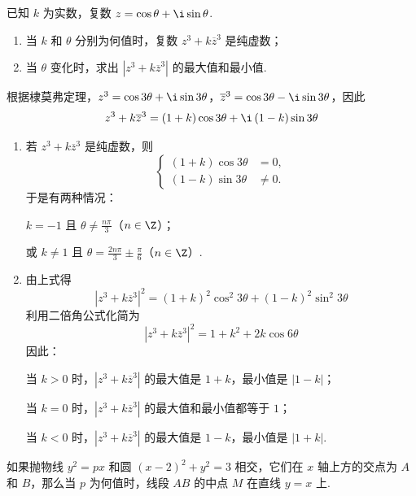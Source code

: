 \documentclass[UTF8,a4paper,oneside,11pt]{ctexbook}
\begin{document}
\begin{problem}

已知 \(k\) 为实数，复数 \(z=\cos\theta+\i\sin\theta\).

\begin{enumerate}
\item 当 \(k\) 和 \(\theta\) 分别为何值时，复数 \(z^3+k\overline{z}^3\) 是纯虚数；
\item 当 \(\theta\) 变化时，求出 \(\left| z^3+k\overline{z}^3 \right|\) 的最大值和最小值.
\end{enumerate}
\end{problem}

\begin{solution}
根据棣莫弗定理，\(z^3=\cos 3\theta+\i\sin 3\theta\)，\(\overline{z}^3=\cos 3\theta-\i\sin 3\theta\)，因此
\[
z^3+k\overline{z}^3=\left( 1+k \right)\cos 3\theta+\i\left( 1-k \right)\sin 3\theta
\]

\begin{enumerate}
\item 若 \(z^3+k\overline{z}^3\) 是纯虚数，则
\[
\begin{cases}
\left( 1+k \right)\cos 3\theta&=0,\\
\left( 1-k \right)\sin 3\theta&\ne 0.
\end{cases}
\]
于是有两种情况：

\(k=-1\) 且 \(\theta\ne \frac{n\pi}{3}\)（\(n\in\Z\)）；

或 \(k\ne 1\) 且 \(\theta=\frac{2n\pi}{3}\pm \frac{\pi}{6}\)（\(n\in\Z\)）.

\item 由上式得
\[
\left| z^3+k\overline{z}^3 \right|^2=\left( 1+k \right)^2\cos^2 3\theta+\left( 1-k \right)^2\sin^2 3\theta
\]
利用二倍角公式化简为
\[
\left| z^3+k\overline{z}^3 \right|^2=1+k^2+2k\cos 6\theta
\]
因此：

当 \(k>0\) 时，\(\left| z^3+k\overline{z}^3 \right|\) 的最大值是 \(1+k\)，最小值是 \(|1-k|\)；

当 \(k=0\) 时，\(\left| z^3+k\overline{z}^3 \right|\) 的最大值和最小值都等于 \(1\)；

当 \(k<0\) 时，\(\left| z^3+k\overline{z}^3 \right|\) 的最大值是 \(1-k\)，最小值是 \(|1+k|\).
\end{enumerate}
\end{solution}

\begin{problem}

如果抛物线 \(y^2=px\) 和圆 \((x-2)^2+y^2=3\) 相交，它们在 \(x\) 轴上方的交点为 \(A\) 和 \(B\)，那么当 \(p\) 为何值时，线段 \(AB\) 的中点 \(M\) 在直线 \(y=x\) 上.

\end{problem}
\end{document}
